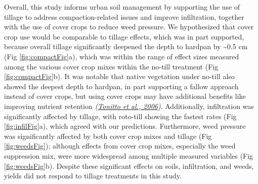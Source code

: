 \documentclass[
  12pt,
]{article}
\begin{document}
Overall, this study informs urban soil management by supporting the use of tillage to address compaction-related issues and improve infiltration, together with the use of cover crops to reduce weed pressure.
We hypothesized that cover crop use would be comparable to tillage effects, which was in part supported, because overall tillage significantly deepened the depth to hardpan by \textasciitilde0.5
cm
(Fig \ref{fig:compactFig}a), which was within the range of effect sizes measured among the various cover crop mixes within the no-till treatment (Fig \ref{fig:compactFig}b).
It was notable that native vegetation under no-till also showed the deepest depth to hardpan, in part supporting a fallow approach instead of cover crops, but using cover crops may have additional benefits like improving nutrient retention \emph{(\protect\hyperlink{ref-tonitto06}{Tonitto et al., 2006})}.
Additionally, infiltration was significantly affected by tillage, with roto-till showing the fastest rates (Fig \ref{fig:infilFig}a), which agreed with our predictions.
Furthermore, weed pressure was significantly affected by both cover crop mixes and tillage (Fig \ref{fig:weedsFig}); although effects from cover crop mixes, especially the weed suppression mix, were more widespread among multiple measured variables (Fig \ref{fig:weedsFig}b).
Despite these significant effects on soils, infiltration, and weeds, yields did not respond to tillage treatments in this study.
\end{document}
